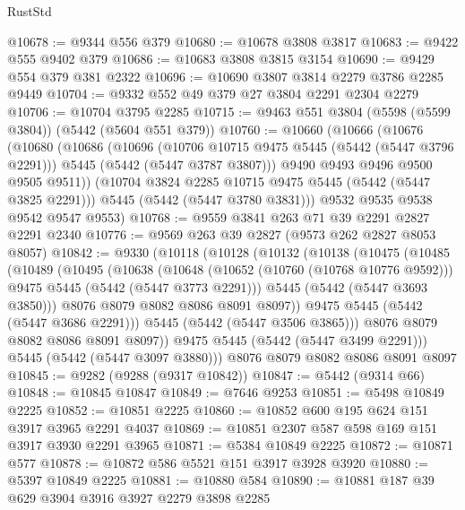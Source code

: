 \begin{lexlean}{RustStd}
\begin{coremodule}
{\begin{coremodule}
{{{{{{{{{{{{@10678 := @9344 @556 @379
@10680 := @10678 @3808 @3817
@10683 := @9422 @555 @9402 @379
@10686 := @10683 @3808 @3815 @3154
@10690 := @9429 @554 @379 @381 @2322
@10696 := @10690 @3807 @3814 @2279 @3786 @2285 @9449
@10704 := @9332 @552 @49 @379 @27 @3804 @2291 @2304 @2279
@10706 := @10704 @3795 @2285
@10715 := @9463 @551 @3804 (@5598 (@5599 @3804)) (@5442 (@5604 @551 @379))
@10760 := @10660
    (@10666
      (@10676
        (@10680
          (@10686
            (@10696
              (@10706 @10715 @9475 @5445 (@5442 (@5447 @3796 @2291)))
              @5445
              (@5442 (@5447 @3787 @3807)))
            @9490
            @9493
            @9496
            @9500
            @9505
            @9511))
        (@10704 @3824 @2285 @10715 @9475 @5445 (@5442 (@5447 @3825 @2291)))
        @5445
        (@5442 (@5447 @3780 @3831)))
      @9532
      @9535
      @9538
      @9542
      @9547
      @9553)
@10768 := @9559 @3841 @263 @71 @39 @2291 @2827 @2291 @2340
@10776 := @9569 @263 @39 @2827 (@9573 @262 @2827 @8053 @8057)
@10842 := @9330
    (@10118
      (@10128
        (@10132
          (@10138
            (@10475
              (@10485
                (@10489
                  (@10495
                    (@10638
                      (@10648
                        (@10652 (@10760 (@10768 @10776 @9592)))
                        @9475
                        @5445
                        (@5442 (@5447 @3773 @2291)))
                      @5445
                      (@5442 (@5447 @3693 @3850)))
                    @8076
                    @8079
                    @8082
                    @8086
                    @8091
                    @8097))
                @9475
                @5445
                (@5442 (@5447 @3686 @2291)))
              @5445
              (@5442 (@5447 @3506 @3865)))
            @8076
            @8079
            @8082
            @8086
            @8091
            @8097))
        @9475
        @5445
        (@5442 (@5447 @3499 @2291)))
      @5445
      (@5442 (@5447 @3097 @3880)))
    @8076
    @8079
    @8082
    @8086
    @8091
    @8097
@10845 := @9282 (@9288 (@9317 @10842))
@10847 := @5442 (@9314 @66)
@10848 := @10845 @10847
@10849 := @7646 @9253
@10851 := @5498 @10849 @2225
@10852 := @10851 @2225
@10860 := @10852 @600 @195 @624 @151 @3917 @3965 @2291 @4037
@10869 := @10851 @2307 @587 @598 @169 @151 @3917 @3930 @2291 @3965
@10871 := @5384 @10849 @2225
@10872 := @10871 @577
@10878 := @10872 @586 @5521 @151 @3917 @3928 @3920
@10880 := @5397 @10849 @2225
@10881 := @10880 @584
@10890 := @10881 @187 @39 @629 @3904 @3916 @3927 @2279 @3898 @2285
}}}}}}}}}}}}
\end{coremodule}}
\end{coremodule}
\end{lexlean}
